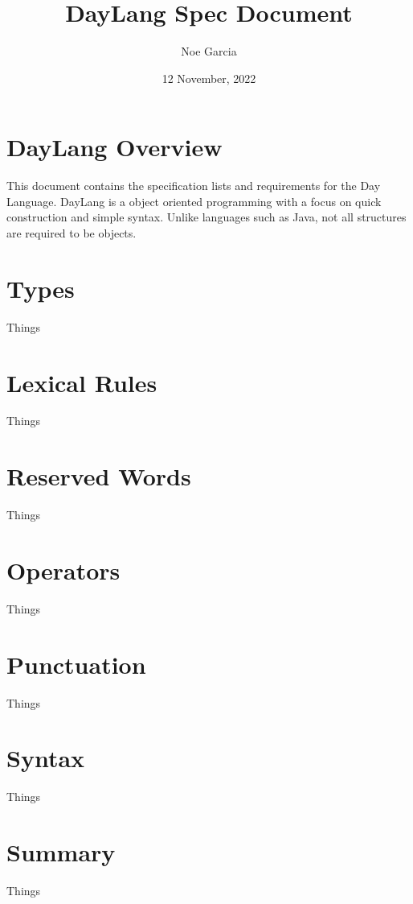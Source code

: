 \documentclass{article}
\title{DayLang Spec Document}
\author{Noe Garcia}
\date{12 November, 2022}
\begin{document}
\maketitle
\newpage

\section{DayLang Overview}
This document contains the specification lists and requirements for the Day Language.
DayLang is a object oriented programming with a focus on quick construction and
simple syntax. Unlike languages such as Java, not all structures are required to be
objects.


\section{Types}
Things


\section{Lexical Rules}
Things


\section{Reserved Words}
Things


\section{Operators}
Things

\section{Punctuation}
Things


\section{Syntax}
Things


\section{Summary}
Things
\end{document}
